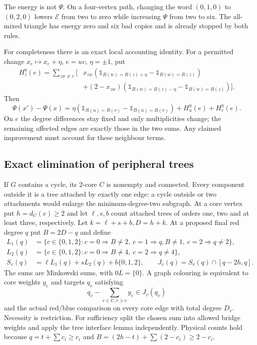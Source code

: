 The energy is not $\Psi$. On a four-vertex path, changing the word
$(0,1,0)$ to $(0,2,0)$ lowers $\mathcal E$ from two to zero while
increasing $\Psi$ from two to six. The all-mixed triangle has energy
zero and six bad copies and is already stopped by both rules.

For completeness there is an exact local accounting identity. For a
permitted change $x_e\mapsto x_e+\eta$, $e=uv$, $\eta=\pm1$, put
\begin{align*}
 H_z^\eta(e)=\sum_{zw\ne e}\bigl[&x_{zw}
 (\mathbb{1}_{R(w)=R(z)+\eta}-\mathbb{1}_{R(w)=R(z)})\\
 &+(2-x_{zw})(\mathbb{1}_{B(w)=B(z)-\eta}-\mathbb{1}_{B(w)=B(z)})\bigr].
\end{align*}
Then
\[
 \Psi(x')-\Psi(x)=\eta(\mathbb{1}_{R(u)=R(v)}-
 \mathbb{1}_{B(u)=B(v)})+H_u^\eta(e)+H_v^\eta(e).
\]
On $e$ the degree differences stay fixed and only multiplicities
change; the remaining affected edges are exactly those in the two
sums. Any claimed improvement must account for these neighbour terms.

\subsection{Exact elimination of peripheral trees}

If $G$ contains a cycle, its 2-core $C$ is nonempty and connected.
Every component outside it is a tree attached by exactly one edge:
a cycle outside or two attachments would enlarge the minimum-degree-two
subgraph. At a core vertex put $h=d_C(v)\ge2$ and let
$\ell,s,b$ count attached trees of orders one, two and at least three,
respectively. Let $k=\ell+s+b,D=h+k$. At a proposed final red degree
$q$ put $B=2D-q$ and define
\begin{align*}
 L_1(q)&=\{c\in\{0,1,2\}:c=0\Rightarrow B\ne2,
 \ c=1\Rightarrow q,B\ne1,\ c=2\Rightarrow q\ne2\},\\
 L_2(q)&=\{c\in\{0,1,2\}:c=0\Rightarrow B\ne4,
 \ c=2\Rightarrow q\ne4\},\\
 S_v(q)&=\ell L_1(q)+s L_2(q)+b\{0,1,2\},\qquad
 J_v(q)=S_v(q)\cap[q-2h,q].
\end{align*}
The sums are Minkowski sums, with $0L=\{0\}$. A graph colouring is
equivalent to core weights $y_e$ and targets $q_v$ satisfying
\[
 q_v-\sum_{e\in C,e\ni v}y_e\in J_v(q_v)
\]
and the actual red/blue comparison on every core edge with total
degree $D_v$. Necessity is restriction. For sufficiency split the
chosen sum into allowed bridge weights and apply the tree interface
lemma independently. Physical counts hold because
$q=t+\sum c_i\ge c_i$ and
$B=(2h-t)+\sum(2-c_i)\ge2-c_i$.

